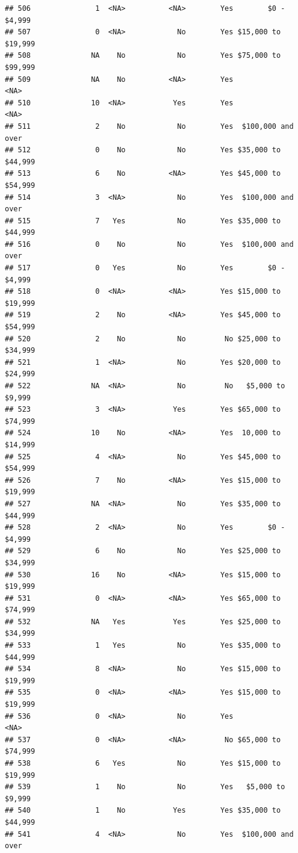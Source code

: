 \documentclass[man]{apa6}
\begin{document}
\begin{verbatim}
## 506               1  <NA>          <NA>        Yes        $0 - $4,999
## 507               0  <NA>            No        Yes $15,000 to $19,999
## 508              NA    No            No        Yes $75,000 to $99,999
## 509              NA    No          <NA>        Yes               <NA>
## 510              10  <NA>           Yes        Yes               <NA>
## 511               2    No            No        Yes  $100,000 and over
## 512               0    No            No        Yes $35,000 to $44,999
## 513               6    No          <NA>        Yes $45,000 to $54,999
## 514               3  <NA>            No        Yes  $100,000 and over
## 515               7   Yes            No        Yes $35,000 to $44,999
## 516               0    No            No        Yes  $100,000 and over
## 517               0   Yes            No        Yes        $0 - $4,999
## 518               0  <NA>          <NA>        Yes $15,000 to $19,999
## 519               2    No          <NA>        Yes $45,000 to $54,999
## 520               2    No            No         No $25,000 to $34,999
## 521               1  <NA>            No        Yes $20,000 to $24,999
## 522              NA  <NA>            No         No   $5,000 to $9,999
## 523               3  <NA>           Yes        Yes $65,000 to $74,999
## 524              10    No          <NA>        Yes  10,000 to $14,999
## 525               4  <NA>            No        Yes $45,000 to $54,999
## 526               7    No          <NA>        Yes $15,000 to $19,999
## 527              NA  <NA>            No        Yes $35,000 to $44,999
## 528               2  <NA>            No        Yes        $0 - $4,999
## 529               6    No            No        Yes $25,000 to $34,999
## 530              16    No          <NA>        Yes $15,000 to $19,999
## 531               0  <NA>          <NA>        Yes $65,000 to $74,999
## 532              NA   Yes           Yes        Yes $25,000 to $34,999
## 533               1   Yes            No        Yes $35,000 to $44,999
## 534               8  <NA>            No        Yes $15,000 to $19,999
## 535               0  <NA>          <NA>        Yes $15,000 to $19,999
## 536               0  <NA>            No        Yes               <NA>
## 537               0  <NA>          <NA>         No $65,000 to $74,999
## 538               6   Yes            No        Yes $15,000 to $19,999
## 539               1    No            No        Yes   $5,000 to $9,999
## 540               1    No           Yes        Yes $35,000 to $44,999
## 541               4  <NA>            No        Yes  $100,000 and over

\end{verbatim}
\end{document}
